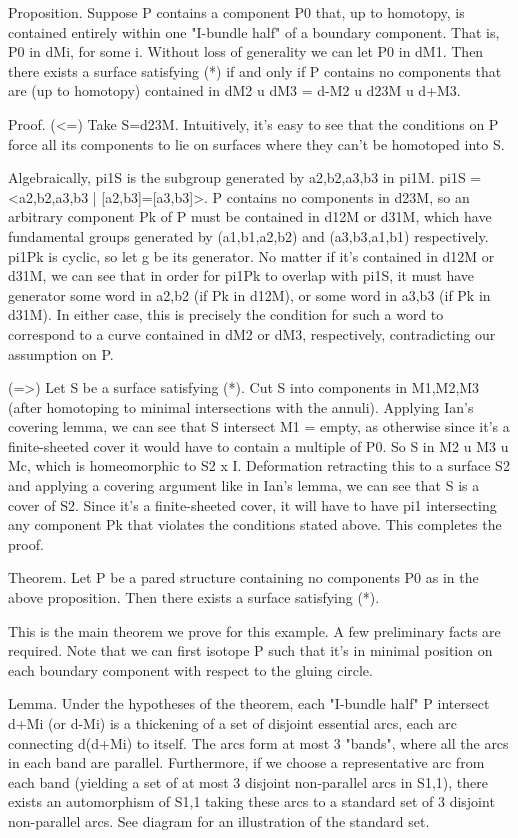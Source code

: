 \documentclass[12pt]{amsart}
\theoremstyle{definition}
\begin{document}
Proposition. Suppose P contains a component P0 that, up to homotopy, is
contained entirely within one "I-bundle half" of a boundary component. That is,
P0 in dMi, for some i. Without loss of generality we can let P0 in dM1. Then
there exists a surface satisfying (*) if and only if P contains no components
that are (up to homotopy) contained in dM2 u dM3 = d-M2 u d23M u d+M3.

Proof. (<=) Take S=d23M. Intuitively, it's easy to see that the conditions on
P force all its components to lie on surfaces where they can't be homotoped
into S.

Algebraically, pi1S is the subgroup generated by
a2,b2,a3,b3 in pi1M. pi1S = <a2,b2,a3,b3 | [a2,b3]=[a3,b3]>. P contains no
components in d23M, so an arbitrary component Pk of P  must be contained in
d12M or d31M, which have fundamental groups generated by (a1,b1,a2,b2) and
(a3,b3,a1,b1) respectively. pi1Pk is cyclic, so let g be its generator. No
matter if it's contained in d12M or d31M, we can see that in order for pi1Pk to
overlap with pi1S, it must have generator some word in a2,b2 (if Pk in d12M),
or some word in a3,b3 (if Pk in d31M). In either case, this is precisely the
condition for such a word to correspond to a curve contained in dM2 or dM3,
respectively, contradicting our assumption on P.

(=>) Let S be a surface satisfying (*). Cut S into components in M1,M2,M3
(after homotoping to minimal intersections with the annuli). Applying Ian's
covering lemma, we can see that S intersect M1 = empty, as otherwise since it's
a finite-sheeted cover it would have to contain a multiple of P0.
So S in M2 u M3 u Mc, which is homeomorphic to S2 x I. Deformation retracting
this to a surface S2 and applying a covering argument like in Ian's lemma, we
can see that S is a cover of S2. Since it's a finite-sheeted cover, it will
have to have pi1 intersecting any component Pk that violates the conditions
stated above. This completes the proof.

Theorem. Let P be a pared structure containing no components P0 as in the above
proposition. Then there exists a surface satisfying (*).

This is the main theorem we prove for this example. A few preliminary facts are
required. Note that we can first isotope P such that it's in minimal position
on each boundary component with respect to the gluing circle.

Lemma. Under the hypotheses of the theorem, each "I-bundle half" P intersect
d+Mi (or d-Mi) is a thickening of a set of disjoint essential arcs, each arc
connecting d(d+Mi) to itself. The arcs form at most 3 "bands", where all the
arcs in each band are parallel.  Furthermore, if we choose a representative arc
from each band (yielding a set of at most 3 disjoint non-parallel arcs in
S1,1), there exists an automorphism of S1,1 taking these arcs to a standard set
of 3 disjoint non-parallel arcs.  See diagram for an illustration of the
standard set.
\end{document}
